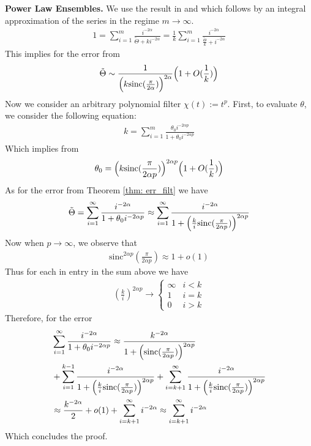 \documentclass[conference]{IEEEtran}
\newcommand{\sinc}{\text{sinc}}
\begin{document}
\textbf{Power Law Ensembles. } We use the result in \cite{simon2023more} and \cite{ildiz2024high} which follows by an integral approximation of the series in the regime $m \rightarrow \infty$.
\begin{align*}
    1 = \sum_{i=1}^m \frac{i^{-2\alpha}}{\tilde{\Theta} + k i^{-2\alpha}} = \frac{1}{k} \sum_{i=1}^m \frac{i^{-2\alpha}}{\frac{\tilde{\Theta}}{k} + i^{-2\alpha}} 
\end{align*}
This implies for the error from \cite{ildiz2024high}
\begin{align*}
     \tilde{\Theta} \sim \frac{1}{\Bigl(k \sinc(\frac{\pi}{2\alpha} )\Bigr)^{2\alpha}} \Bigl(1 + O(\frac{1}{k})\Bigr)
\end{align*}
Now we consider an arbitrary polynomial filter $\chi(t) := t^p$. First, to evaluate $\theta$, we consider the following equation:
\begin{align*}
    k = \sum_{i=1}^m \frac{\theta_0 i^{-2\alpha p}}{1 + \theta_0 i^{-2\alpha p}} 
\end{align*}
Which implies from \cite{ildiz2024high}
\begin{align*}
    \theta_0 = \Bigl(k \sinc(\frac{\pi}{2\alpha p} )\Bigr)^{2\alpha p} \Bigl(1 + O(\frac{1}{k})\Bigr)
\end{align*}
As for the error from Theorem \ref{thm: err_filt} we have
\begin{align*}
    \tilde{\Theta} = \sum_{i=1}^\infty \frac{i^{-2\alpha}}{1 + \theta_0 i^{-2\alpha p}}  \approx  \sum_{i=1}^\infty \frac{i^{-2\alpha}}{1 +  \Bigl(\frac{k}{i} \sinc(\frac{\pi}{2\alpha p} )\Bigr)^{2\alpha p} }
\end{align*}
Now when $p \rightarrow \infty$, we observe that
\begin{align*}
    \sinc^{2\alpha p}(\frac{\pi}{2\alpha p} ) \approx 1 + o(1)
\end{align*}
Thus for each in entry in the sum above we have
\begin{align*}
    (\frac{k}{i})^{2\alpha p} \rightarrow \begin{cases}
        \infty & i < k\\
        1 & i = k \\
        0 & i > k
    \end{cases}
\end{align*}
Therefore, for the error
\begin{align*}
    & \sum_{i=1}^{\infty} \frac{i^{-2\alpha}}{1 + \theta_0 i^{-2\alpha p}} \approx \frac{k^{-2\alpha}}{1 +  \Bigl(\sinc(\frac{\pi}{2\alpha p} )\Bigr)^{2\alpha p} } \\ & + \sum_{i=1}^{k-1} \frac{i^{-2\alpha}}{1 +  \Bigl(\frac{k}{i} \sinc(\frac{\pi}{2\alpha p} )\Bigr)^{2\alpha p} }  + \sum_{i=k+1}^{\infty} \frac{i^{-2\alpha}}{1 +  \Bigl(\frac{k}{i} \sinc(\frac{\pi}{2\alpha p} )\Bigr)^{2\alpha p} } \\ 
   &  \approx \frac{k^{-2\alpha}}{2} + o(1) + \sum_{i=k+1}^{\infty} i^{-2\alpha} \approx \sum_{i=k+1}^{\infty} i^{-2\alpha}
\end{align*}
Which concludes the proof.
\end{document}
